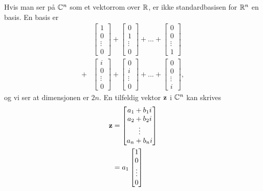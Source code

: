 \begin{ex}
Hvis man ser på $\mathbb{C}^n$ som et vektorrom over $\mathbb{R}$, er ikke standardbasisen for $\mathbb{R}^n$ en basis. En basis er
\begin{align*}
&
\begin{bmatrix}
1    \\ 0  \\ \vdots \\ 0
\end{bmatrix}
+
\begin{bmatrix}
0    \\ 1  \\ \vdots \\ 0
\end{bmatrix}
+...+
\begin{bmatrix}
0    \\ 0  \\ \vdots \\ 1
\end{bmatrix}
\\ +
&
\begin{bmatrix}
i    \\ 0  \\ \vdots \\ 0
\end{bmatrix}
+
\begin{bmatrix}
0    \\ i  \\ \vdots \\ 0
\end{bmatrix}
+...+
\begin{bmatrix}
0    \\ 0  \\ \vdots \\ i
\end{bmatrix},
\end{align*}
og vi ser at dimensjonen er $2n$. 
En tilfeldig vektor $\mathbf{z}$ i $\mathbb{C}^n$ kan skrives
\begin{align*}
\V z&=
\begin{bmatrix}
a_1+b_1 i    \\ a_2+b_2 i   \\ \vdots \\ a_n+b_n i 
\end{bmatrix}
\\&= 
a_1
\begin{bmatrix}
1    \\ 0  \\ \vdots \\ 0
\end{bmatrix}

\end{align*}
\end{ex}
